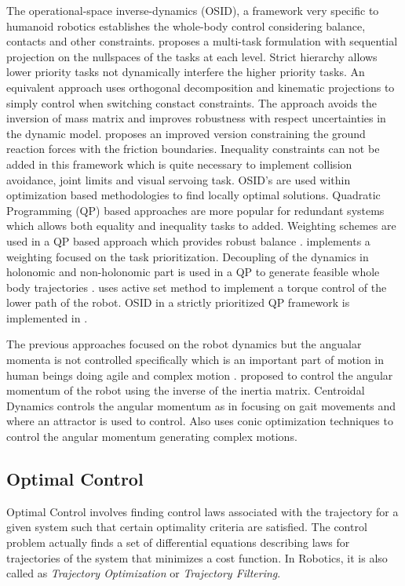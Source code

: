 The operational-space inverse-dynamics (OSID), a framework very specific to humanoid robotics establishes the whole-body control considering balance, contacts and other constraints. \cite{Khatib2004} proposes a multi-task formulation with sequential projection on  the nullspaces of the tasks at each level. Strict hierarchy allows lower priority tasks not dynamically interfere the higher priority tasks. An equivalent approach \cite{mistry2010inverse} uses orthogonal decomposition and kinematic projections to simply control when switching constact constraints. The approach avoids the inversion of mass matrix and improves robustness with respect uncertainties in the dynamic model. \cite{Righetti2011a,Righetti2011} proposes an improved version constraining the ground reaction forces with the friction boundaries. Inequality constraints can not be added in this framework which is quite necessary to implement collision avoidance, joint limits and visual servoing task. OSID's are used within optimization based methodologies to find locally optimal solutions. Quadratic Programming (QP) based approaches are more popular for redundant systems which allows both equality and inequality tasks to added. Weighting schemes are used in a QP based approach which provides robust balance \cite{collette2008robust}. \cite{Salini2011} implements a weighting focused on the task prioritization. Decoupling of the dynamics in holonomic and non-holonomic part is used in a QP to generate feasible whole body trajectories \cite{bouyarmane2012dynamics,wieber2006holonomy}. \cite{herzog2013experiments} uses active set method to implement a torque control of the lower path of the robot. OSID in a strictly prioritized QP framework is implemented in \cite{Saab2013}. 


The previous approaches focused on the robot dynamics but the angualar momenta is not controlled specifically which is an important part of motion in human beings doing agile and complex motion \cite{popovic2004angular}. \cite{kajita2003resolved} proposed to control the angular momentum of the robot using the inverse of the inertia matrix. Centroidal Dynamics controls the angular momentum as in \cite{hofmann2009exploiting} focusing on gait movements and \cite{moro2013attractor} where an attractor is used to control. Also \cite{wensing2013generation} uses conic optimization techniques to control the angular momentum generating complex motions.

\subsection{Optimal Control}
Optimal Control involves finding control laws associated with the trajectory for a given system such that certain optimality criteria
are satisfied. The control problem actually finds a set of differential equations describing laws for trajectories of the system that minimizes a cost function. In Robotics, it is also called as \textit{Trajectory Optimization} or \textit{Trajectory Filtering}.

